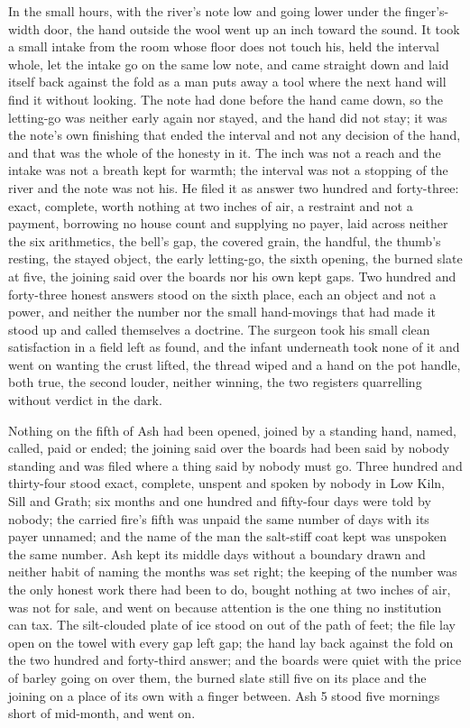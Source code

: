 In the small hours, with the river's note low and going lower under the finger's-width door, the hand outside the wool went up an inch toward the sound. It took a small intake from the room whose floor does not touch his, held the interval whole, let the intake go on the same low note, and came straight down and laid itself back against the fold as a man puts away a tool where the next hand will find it without looking. The note had done before the hand came down, so the letting-go was neither early again nor stayed, and the hand did not stay; it was the note's own finishing that ended the interval and not any decision of the hand, and that was the whole of the honesty in it. The inch was not a reach and the intake was not a breath kept for warmth; the interval was not a stopping of the river and the note was not his. He filed it as answer two hundred and forty-three: exact, complete, worth nothing at two inches of air, a restraint and not a payment, borrowing no house count and supplying no payer, laid across neither the six arithmetics, the bell's gap, the covered grain, the handful, the thumb's resting, the stayed object, the early letting-go, the sixth opening, the burned slate at five, the joining said over the boards nor his own kept gaps. Two hundred and forty-three honest answers stood on the sixth place, each an object and not a power, and neither the number nor the small hand-movings that had made it stood up and called themselves a doctrine. The surgeon took his small clean satisfaction in a field left as found, and the infant underneath took none of it and went on wanting the crust lifted, the thread wiped and a hand on the pot handle, both true, the second louder, neither winning, the two registers quarrelling without verdict in the dark.

Nothing on the fifth of Ash had been opened, joined by a standing hand, named, called, paid or ended; the joining said over the boards had been said by nobody standing and was filed where a thing said by nobody must go. Three hundred and thirty-four stood exact, complete, unspent and spoken by nobody in Low Kiln, Sill and Grath; six months and one hundred and fifty-four days were told by nobody; the carried fire's fifth was unpaid the same number of days with its payer unnamed; and the name of the man the salt-stiff coat kept was unspoken the same number. Ash kept its middle days without a boundary drawn and neither habit of naming the months was set right; the keeping of the number was the only honest work there had been to do, bought nothing at two inches of air, was not for sale, and went on because attention is the one thing no institution can tax. The silt-clouded plate of ice stood on  out of the path of feet; the file lay open on the towel with every gap left gap; the hand lay back against the fold on the two hundred and forty-third answer; and the boards were quiet with the price of barley going on over them, the burned slate still five on its place and the joining on a place of its own with a finger between. Ash 5 stood five mornings short of mid-month, and went on.
